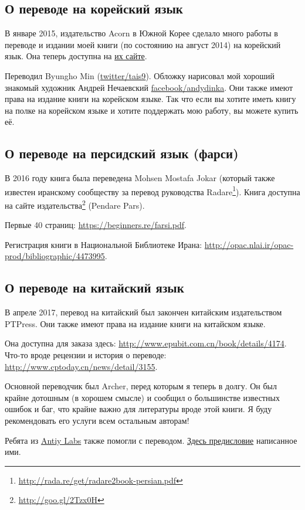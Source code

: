 



\subsection*{О переводе на корейский язык}

В январе 2015, издательство Acorn в Южной Корее сделало много работы в переводе 
и издании моей книги (по состоянию на август 2014) на корейский язык.
Она теперь доступна на \href{http://go.yurichev.com/17343}{их сайте}.

\iffalse
\begin{figure}[H]
\centering
\texttt{[image: acorn\_cover.jpg]}
\end{figure}
\fi

Переводил Byungho Min (\href{http://go.yurichev.com/17344}{twitter/tais9}).
Обложку нарисовал мой хороший знакомый художник Андрей Нечаевский
\href{http://go.yurichev.com/17023}{facebook/andydinka}.
Они также имеют права на издание книги на корейском языке.
Так что если вы хотите иметь  книгу на полке на корейском языке и
хотите поддержать мою работу, вы можете купить её.

\subsection*{О переводе на персидский язык (фарси)}

В 2016 году книга была переведена Mohsen Mostafa Jokar (который также известен иранскому сообществу за перевод руководства Radare\footnote{\url{http://rada.re/get/radare2book-persian.pdf}}).
Книга доступна на сайте издательства\footnote{\url{http://goo.gl/2Tzx0H}} (Pendare Pars).

Первые 40 страниц: \url{https://beginners.re/farsi.pdf}.

Регистрация книги в Национальной Библиотеке Ирана: \url{http://opac.nlai.ir/opac-prod/bibliographic/4473995}.

\subsection*{О переводе на китайский язык}

В апреле 2017, перевод на китайский был закончен китайским издательством PTPress. Они также имеют права на издание книги на китайском языке.

Она доступна для заказа здесь: \url{http://www.epubit.com.cn/book/details/4174}. Что-то вроде рецензии и история о переводе: \url{http://www.cptoday.cn/news/detail/3155}.

Основной переводчик был Archer, перед которым я теперь в долгу.
Он был крайне дотошным (в хорошем смысле) и сообщил о большинстве известных ошибок и баг, что крайне важно для литературы вроде этой книги.
Я буду рекомендовать его услуги всем остальным авторам!

Ребята из \href{http://www.antiy.net/}{Antiy Labs} также помогли с переводом. \href{http://www.epubit.com.cn/book/onlinechapter/51413}{Здесь предисловие} написанное ими.

